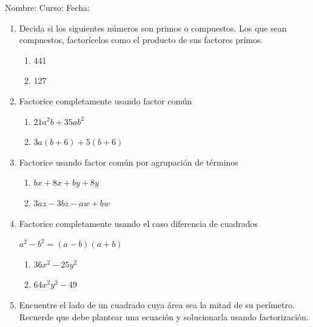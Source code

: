 \documentclass[letterpaper,fleqn]{article}
\newcommand{\LineaNombre}{%
\par
\vspace{\baselineskip}
Nombre:\hrulefill \; Curso: \underline{\hspace*{48pt}} \; Fecha: \underline{\hspace*{2.5cm}} \relax
\par}
\begin{document}
\LineaNombre
\begin{enumerate}
 \item Decida si los siguientes números son primos o compuestos. Los que sean compuestos, factorícelos como el producto de sus factores primos.
 \begin{enumerate}
 \item 441\noanswer
 \item 127 \noanswer
 \end{enumerate}
 \item Factorice completamente usando factor común
 \begin{enumerate}
 \item $21a^{2}b+35ab^{2}$\noanswer
 \item $3a(b+6)+5(b+6)$\noanswer
 \end{enumerate}
 \item Factorice usando factor común por agrupación de términos
 \begin{enumerate}
 \item $bx+8x+by+8y$\noanswer
 \newpage
 \item $3az-3bz-aw+bw$\noanswer
 \end{enumerate}
 \item Factorice completamente usando el caso diferencia de cuadrados
  \begin{center}
  $a^{2}-b^{2}=(a-b)(a+b)$
  \end{center}
\begin{enumerate}
\item $36x^{2}-25y^{2}$\noanswer
\item $64x^{2}y^{2}-49$\noanswer
\end{enumerate}
\item Encuentre el lado de un cuadrado cuya área sea la mitad de su perímetro. Recuerde que debe plantear una ecuación y solucionarla usando factorización.\noanswer
 \end{enumerate}
\end{document}

